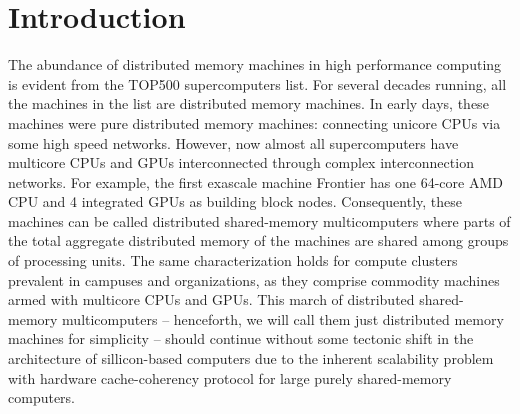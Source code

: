 \documentclass[ASNA,twocolumn]{USG} %
\begin{document}





\maketitle


\section{Introduction}
\label{sec:introduction}
The abundance of distributed memory machines in high performance computing is evident from the TOP500 \citep{Dongarra2011} supercomputers list. For several decades running, all the machines in the list are distributed memory machines. In early days, these machines were pure distributed memory machines: connecting unicore CPUs via some high speed networks. However, now almost all supercomputers have multicore CPUs and GPUs interconnected through complex interconnection networks. For example, the first exascale machine Frontier \citep{10485138} has one 64-core AMD CPU and 4 integrated GPUs as building block nodes. Consequently, these machines can be called distributed shared-memory multicomputers where parts of the total aggregate distributed memory of the machines are shared among groups of processing units. The same characterization holds for compute clusters prevalent in campuses and organizations, as they comprise commodity machines armed with multicore CPUs and GPUs. This march of distributed shared-memory multicomputers -- henceforth, we will call them just distributed memory machines for simplicity -- should continue without some tectonic shift in the architecture of sillicon-based computers due to the inherent scalability problem with hardware cache-coherency protocol \citep{10.1145/158439.158907} for large purely shared-memory computers.
\end{document}
